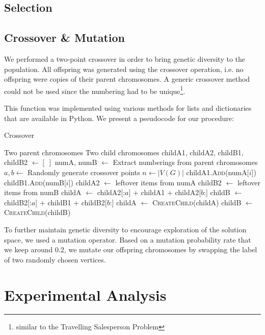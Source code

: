 \documentclass[conference,compsoc]{IEEEtran}
\begin{document}
\subsection{Selection}
\lipsum[1]
\subsection{Crossover \& Mutation}
We performed a two-point crossover in order to bring genetic diversity to the 
population. All offspring was generated using the crossover operation, i.e. no offspring 
were copies of their parent chromosomes. A generic crossover 
method could not be used since the numbering had to be unique\footnote{similar to the Travelling Salesperson Problem}.

This function was implemented using various methods for lists and 
dictionaries that are available in 
Python. We present a pseudocode for our procedure: 

\begin{algorithm}
  \caption{Crossover}
  \begin{algorithmic}[1]
    \renewcommand{\algorithmicrequire}{\textbf{Input:}}
    \renewcommand{\algorithmicensure}{\textbf{Output:}}
    \REQUIRE Two parent chromosomes
    \ENSURE Two child chromosomes
    \STATE childA1, childA2, childB1, childB2 $\leftarrow [\;]$
    \STATE numA, numB $\leftarrow$ Extract numberings from parent chromosomes
    \STATE $a, b \leftarrow $ Randomly generate crossover points 
    \STATE $n \leftarrow |V(G)|$
    \STATE childA1.\textsc{Add}(numA[$i$])
    \STATE childB1.\textsc{Add}(numB[$i$])  
    \ENDFOR 
    \STATE childA2 $\leftarrow$ leftover items from numA 
    \STATE childB2 $\leftarrow$ leftover items from numB
    \STATE childA $\leftarrow$ childA2[:$a$] + childA1 + childA2[$b$:]  
    \STATE childB $\leftarrow$ childB2[:$a$] + childB1 + childB2[$b$:]
    \STATE childA $\leftarrow$ \textsc{CreateChild}(childA)
    \STATE childB $\leftarrow$ \textsc{CreateChild}(childB)
  \end{algorithmic}
\end{algorithm}

To further maintain genetic diversity to encourage exploration of the solution space, 
we used a mutation operator. Based on a mutation probability rate that we keep 
around 0.2, we mutate our offspring chromosomes by swapping the label of two 
randomly chosen vertices. 

\section{Experimental Analysis}
\end{document}

